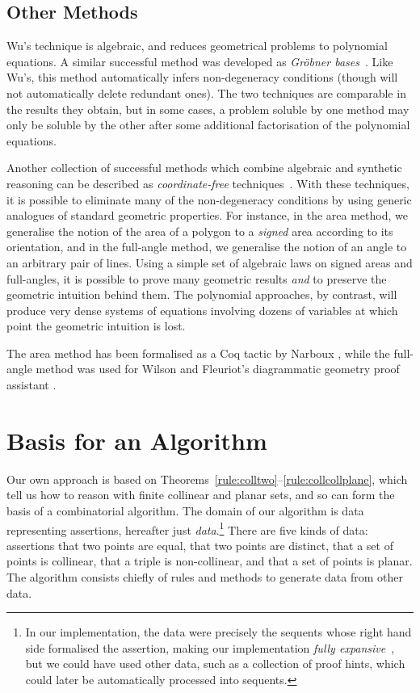 \subsection{Other Methods}
Wu's technique is algebraic, and reduces geometrical problems to polynomial equations. A similar successful method was developed as \emph{Gr\"{o}bner bases}~\cite{BuchbergerGrobner}. Like Wu's, this method automatically infers non-degeneracy conditions (though will not automatically delete redundant ones). The two techniques are comparable in the results they obtain, but in some cases, a problem soluble by one method may only be soluble by the other after some additional factorisation of the polynomial equations.

Another collection of successful methods which combine algebraic and synthetic reasoning can be described as \emph{coordinate-free} techniques~\cite{MachineProofsInGeometry}. With these techniques, it is possible to eliminate many of the non-degeneracy conditions by using generic analogues of standard geometric properties. For instance, in the area method, we generalise the notion of the area of a polygon to a \emph{signed} area according to its orientation, and in the full-angle method, we generalise the notion of an angle to an arbitrary pair of lines. Using a simple set of algebraic laws on signed areas and full-angles, it is possible to prove many geometric results \emph{and} to preserve the geometric intuition behind them. The polynomial approaches, by contrast, will produce very dense systems of equations involving dozens of variables at which point the geometric intuition is lost. 

The area method has been formalised as a Coq tactic by Narboux \cite{NarbouxAreaMethod}, while the full-angle method was used for Wilson and Fleuriot's diagrammatic geometry proof assistant \cite{GeometryExplorer}.

\section{Basis for an Algorithm}
Our own approach is based on Theorems~\ref{rule:colltwo}--\ref{rule:collcollplane}, which tell us how to reason with finite collinear and planar sets, and so can form the basis of a combinatorial algorithm. The domain of our algorithm is data representing assertions, hereafter just \emph{data}.\footnote{In our implementation, the data were precisely the sequents whose right hand side formalised the assertion, making our implementation \emph{fully expansive}~\cite{FullyExpansive}, but we could have used other data, such as a collection of proof hints, which could later be automatically processed into sequents.} There are five kinds of data: assertions that two points are equal, that two points are distinct, that a set of points is collinear, that a triple is non-collinear, and that a set of points is planar. The algorithm consists chiefly of rules and methods to generate data from other data.


